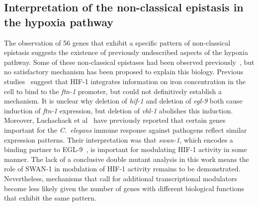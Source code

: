 \documentclass[9pt,twocolumn,twoside,lineno]{pnas-new}
\newcommand{\cel}{\emph{C.~elegans}}
\newcommand{\gene}[1]{\emph{#1}}
\newcommand{\ftna}{\emph{\mbox{ftn-1}}}
\newcommand{\eglp}{EGL-9}
\newcommand{\hifp}{HIF-1}
\newcommand{\hifohtargets}{56}
\begin{document}
%

\subsection*{Interpretation of the non-classical epistasis in the hypoxia pathway}
The observation of \hifohtargets{} genes that exhibit a specific pattern of
non-classical epistasis suggests the existence of previously undescribed aspects
of the hypoxia pathway. Some of these non-classical epistases had been observed
previously~\cite{Ackerman2012,Romney2011,Luhachack2012}, but
no satisfactory mechanism has been proposed to explain this biology.
Previous studies~\cite{Romney2011,Ackerman2012} suggest that \hifp{} integrates
information on iron concentration in the cell to bind to the \ftna{} promoter,
but could not definitively establish a mechanism.
It is unclear why deletion of \gene{hif-1} and deletion of \gene{egl-9} both
cause induction of \ftna{} expression,
but deletion of \gene{vhl-1} abolishes this induction. Moreover, Luchachack et
al~\cite{Luhachack2012} have previously reported that certain genes important
for the \cel{} immune response against pathogens reflect similar expression
patterns. Their interpretation was that \gene{swan-1}, which encodes a binding
partner to \eglp{}~\cite{Shao2010}, is important for modulating \hifp{} activity
in some manner. The lack of a conclusive double mutant analysis in this work
means the role of SWAN-1 in modulation of \hifp{} activity remains to be
demonstrated. Nevertheless, mechanisms that call for additional transcriptional
modulators become less likely given the number of genes with different biological
functions that exhibit the same pattern.
\end{document}
